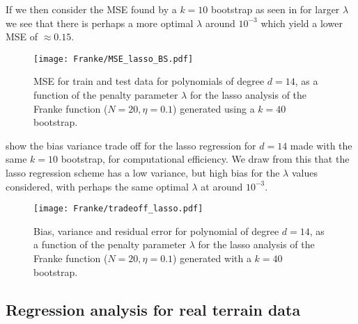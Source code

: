         If we then consider the MSE found by a $k=10$ bootstrap as seen in  for larger $\lambda$ we see that there is perhaps a more optimal $\lambda$ around $10^{-3}$ which yield a lower MSE of $\approx 0.15$. 

        \begin{figure}
            \texttt{[image: Franke/MSE\_lasso\_BS.pdf]}
            \caption{MSE for train and test data for polynomials of degree $d=14$, as a function of the penalty parameter $\lambda$ for the lasso analysis of the Franke function ($N=20, \eta=0.1$) generated using a $k=40$ bootstrap. }
            \label{fig:bootstrapping_lasso}
        \end{figure}


         show the bias variance trade off for the lasso regression for $d=14$ made with the same $k=10$ bootstrap, for computational efficiency. We draw from this that the lasso regression scheme has a low variance, but high bias for the $\lambda$ values considered, with perhaps the same optimal $\lambda$ at around $10^{-3}$.


        \begin{figure}
            \texttt{[image: Franke/tradeoff\_lasso.pdf]}
            \caption{Bias, variance and residual error for polynomial of degree $d=14$, as a function of the penalty parameter $\lambda$ for the lasso analysis of the Franke function ($N=20, \eta=0.1$) generated with a $k=40$ bootstrap.}
            \label{fig:bias_variance_lasso}
        \end{figure} 
        



        \clearpage

    \newpage

    \subsection{Regression analysis for real terrain data}\label{sec:reganalysis_real_data}

